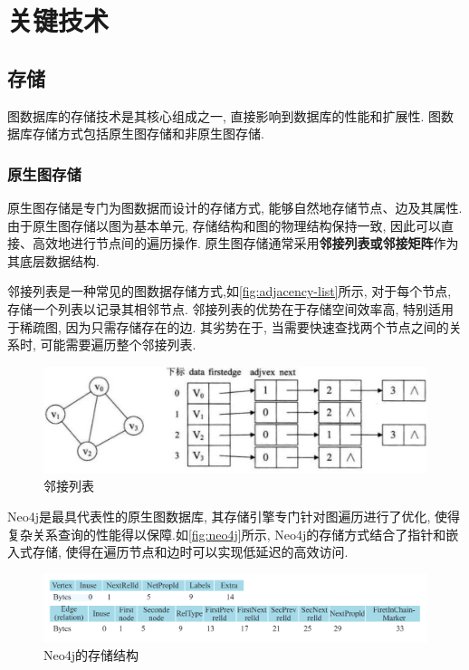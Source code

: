 \section{关键技术}

\subsection{存储}

图数据库的存储技术是其核心组成之一, 直接影响到数据库的性能和扩展性. 图数据库存储方式包括原生图存储和非原生图存储.

\subsubsection*{原生图存储}

原生图存储是专门为图数据而设计的存储方式, 能够自然地存储节点、边及其属性. 由于原生图存储以图为基本单元, 存储结构和图的物理结构保持一致, 因此可以直接、高效地进行节点间的遍历操作. 原生图存储通常采用\textbf{邻接列表或邻接矩阵}作为其底层数据结构.

邻接列表是一种常见的图数据存储方式,如\autoref{fig:adjacency-list}所示, 对于每个节点, 存储一个列表以记录其相邻节点. 邻接列表的优势在于存储空间效率高, 特别适用于稀疏图, 因为只需存储存在的边. 其劣势在于, 当需要快速查找两个节点之间的关系时, 可能需要遍历整个邻接列表.
\begin{figure}[H]
	\centering
	\includegraphics[width=1\textwidth]{images/11.png}
	\caption{邻接列表}
	\label{fig:adjacency-list}
\end{figure}

Neo4j是最具代表性的原生图数据库, 其存储引擎专门针对图遍历进行了优化, 使得复杂关系查询的性能得以保障.如\autoref{fig:neo4j}所示, Neo4j的存储方式结合了指针和嵌入式存储, 使得在遍历节点和边时可以实现低延迟的高效访问.
\begin{figure}[H]
	\centering
	\includegraphics[width=1\textwidth]{images/4.png}
	\caption{Neo4j的存储结构}
	\label{fig:neo4j}
\end{figure}

